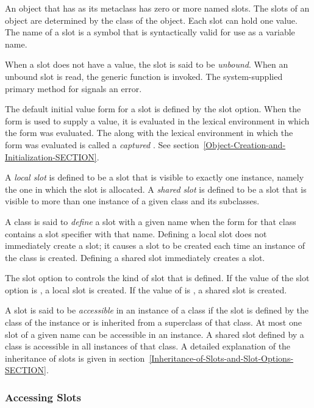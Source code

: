 An object that has  as its metaclass has zero or
more named slots.  The slots of an object are determined by the class
of the object.  Each slot can hold one value.  The name of a slot is a
symbol that is syntactically valid for use as a variable
name.

When a slot does not have a value, the slot is said to be \emph{unbound}.  When
an unbound slot is read, the generic function  is invoked. The
system-supplied primary method for  signals an error. 

The default initial value form for a slot is defined by the  slot
option. When the  form is used to 
supply a value, it is evaluated in the lexical environment in which
the  form was evaluated. The  along with
the lexical environment in which the  form was evaluated
is called a \emph{captured} .
See section~\ref{Object-Creation-and-Initialization-SECTION}.

A \emph{local slot} is defined to be a slot that is visible to exactly
one instance, namely the one in which the slot is allocated.  A \emph{shared
  slot} is defined to be a slot that is visible to more than one instance of a
given class and its subclasses.

A class is said to \emph{define} a slot with a given name when
the  form for that class contains a slot specifier with
that name.  Defining a local slot does not immediately create a slot;
it causes a slot to be created each time an instance of the class is
created.  Defining a shared slot immediately creates a slot.

The  slot option to  controls the kind
of slot that is defined.  If the value of the  slot
option is , a local slot is created.  If the value of
 is , a shared slot is created.

A slot is said to be \emph{accessible} in an instance of a class if
the slot is defined by the class of the instance or is inherited from
a superclass of that class.  At most one slot of a given name can be
accessible in an instance.  A shared slot defined by a class is
accessible in all instances of that class.  A detailed explanation of
the inheritance of slots is given in
section~\ref{Inheritance-of-Slots-and-Slot-Options-SECTION}.

\subsubsection{Accessing Slots}

